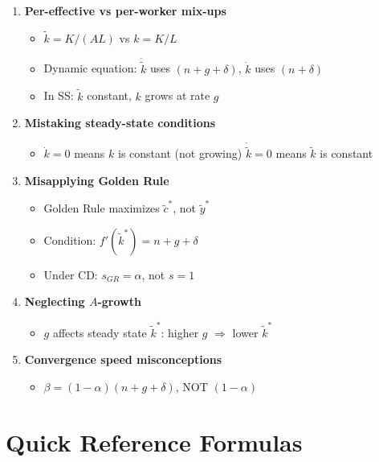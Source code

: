 \documentclass[a4paper,11pt]{article}
\newcommand{\ktilde}{\tilde{k}}
\newcommand{\ytilde}{\tilde{y}}
\newcommand{\ctilde}{\tilde{c}}
\begin{document}
\begin{enumerate}
    \item \textbf{Per-effective vs per-worker mix-ups}
    \begin{itemize}
        \item $\ktilde = K/(AL)$ vs $k = K/L$
        \item Dynamic equation: $\dot{\ktilde}$ uses $(n+g+\delta)$, $\dot{k}$ uses $(n+\delta)$
        \item In SS: $\ktilde$ constant, $k$ grows at rate $g$
    \end{itemize}

    \item \textbf{Mistaking steady-state conditions}
    \begin{itemize}
        \item $\dot{k} = 0$ means $k$ is constant (not growing)
        $\dot{\ktilde} = 0$ means $\ktilde$ is constant
    \end{itemize}

    \item \textbf{Misapplying Golden Rule}
    \begin{itemize}
        \item Golden Rule maximizes $\ctilde^{*}$, not $\ytilde^{*}$
        \item Condition: $f'(\ktilde^{*}) = n+g+\delta$
        \item Under CD: $s_{GR} = \alpha$, not $s = 1$
    \end{itemize}

    \item \textbf{Neglecting $A$-growth}
    \begin{itemize}
        \item $g$ affects steady state $\ktilde^{*}$: higher $g$ $\Rightarrow$ lower $\ktilde^{*}$
    \end{itemize}

    \item \textbf{Convergence speed misconceptions}
    \begin{itemize}
        \item $\beta = (1-\alpha)(n+g+\delta)$, NOT $(1-\alpha)$
    \end{itemize}
\end{enumerate}

\clearpage

\section{Quick Reference Formulas}
\end{document}
